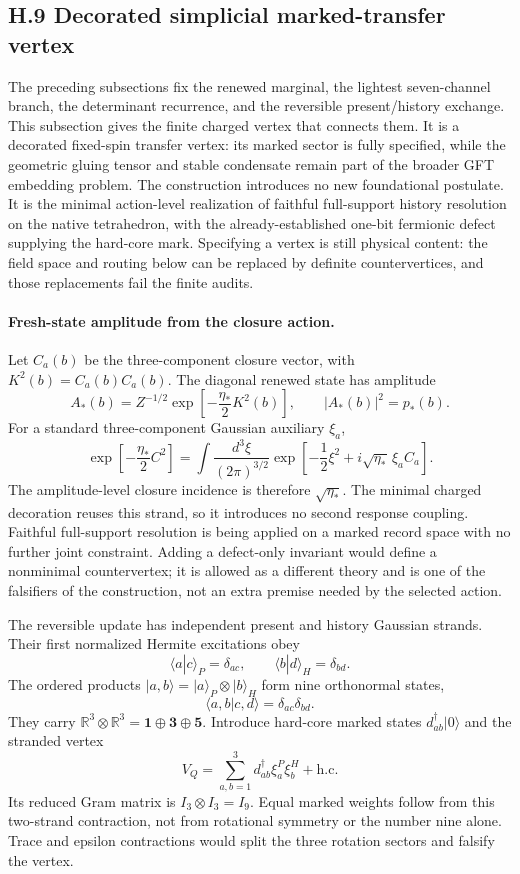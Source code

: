 \documentclass[11pt]{article}
\begin{document}
\subsection*{H.9 Decorated simplicial marked-transfer vertex}

The preceding subsections fix the renewed marginal, the lightest seven-channel branch, the determinant recurrence, and the reversible present/history exchange. This subsection gives the finite charged vertex that connects them. It is a decorated fixed-spin transfer vertex: its marked sector is fully specified, while the geometric gluing tensor and stable condensate remain part of the broader GFT embedding problem. The construction introduces no new foundational postulate. It is the minimal action-level realization of faithful full-support history resolution on the native tetrahedron, with the already-established one-bit fermionic defect supplying the hard-core mark. Specifying a vertex is still physical content: the field space and routing below can be replaced by definite countervertices, and those replacements fail the finite audits.

\paragraph{Fresh-state amplitude from the closure action.}
Let $C_a(b)$ be the three-component closure vector, with $K^2(b)=C_a(b)C_a(b)$. The diagonal renewed state has amplitude
\[
A_*(b)=Z^{-1/2}\exp\!\left[-\frac{\eta_*}{2}K^2(b)\right],
\qquad
|A_*(b)|^2=p_*(b).
\]
For a standard three-component Gaussian auxiliary $\xi_a$,
\[
\exp\!\left[-\frac{\eta_*}{2}C^2\right]
=\int\frac{d^3\xi}{(2\pi)^{3/2}}
\exp\!\left[-\frac12\xi^2+i\sqrt{\eta_*}\,\xi_aC_a\right].
\]
The amplitude-level closure incidence is therefore $\sqrt{\eta_*}$. The minimal charged decoration reuses this strand, so it introduces no second response coupling. Faithful full-support resolution is being applied on a marked record space with no further joint constraint. Adding a defect-only invariant would define a nonminimal countervertex; it is allowed as a different theory and is one of the falsifiers of the construction, not an extra premise needed by the selected action.

The reversible update has independent present and history Gaussian strands. Their first normalized Hermite excitations obey
\[
\langle a|c\rangle_P=\delta_{ac},
\qquad
\langle b|d\rangle_H=\delta_{bd}.
\]
The ordered products $|a,b\rangle=|a\rangle_P\otimes|b\rangle_H$ form nine orthonormal states,
\[
\langle a,b|c,d\rangle=\delta_{ac}\delta_{bd}.
\]
They carry $\mathbb R^3\otimes\mathbb R^3=\mathbf1\oplus\mathbf3\oplus\mathbf5$. Introduce hard-core marked states $d_{ab}^\dagger|0\rangle$ and the stranded vertex
\[
V_Q=\sum_{a,b=1}^3d_{ab}^\dagger\xi_a^P\xi_b^H+\mathrm{h.c.}
\]
Its reduced Gram matrix is $I_3\otimes I_3=I_9$. Equal marked weights follow from this two-strand contraction, not from rotational symmetry or the number nine alone. Trace and epsilon contractions would split the three rotation sectors and falsify the vertex.
\end{document}
